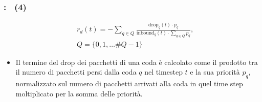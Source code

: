 \documentclass[compress]{beamer}
\begin{document}
\begin{frame}
    \frametitle{\subsecname: \subsubsecname\ (4)}
    \begin{Definition}
        \begin{equation}
            \label{eq:reward_drop}
            \begin{aligned}
                & r_d(t) = -\sum_{q \in Q}\frac{\text{drop}_q(t) \cdot p_q}{\text{inbound}_q(t) \cdot \sum_{q \in Q}p_q},\\
                & Q = \{0, 1, \dots \#Q - 1\} 
            \end{aligned}
        \end{equation}
    \end{Definition}
    \begin{itemize}
        \item Il termine del drop dei pacchetti di una coda è calcolato come il prodotto tra il numero di pacchetti persi dalla coda $q$ nel 
        timestep $t$ e la sua priorità $p_q$, normalizzato sul numero di pacchetti arrivati alla coda in quel time step moltiplicato per la somma delle priorità.
    \end{itemize}
\end{frame}
\end{document}

